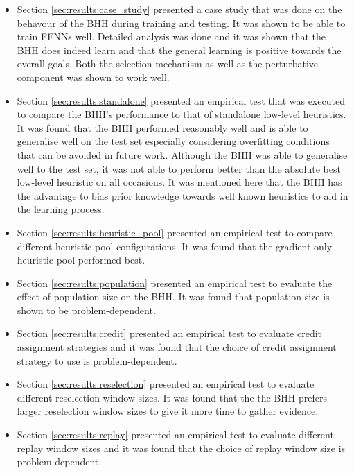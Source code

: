 \begin{itemize}
	\item Section \ref{sec:results:case_study} presented a case study that was done on the behavour of the \Ac{BHH} during training and testing. It was shown to be able to train \acp{FFNN} well. Detailed analysis was done and it was shown that the \Ac{BHH} does indeed learn and that the general learning is positive towards the overall goals. Both the selection mechanism as well as the perturbative component was shown to work well.

	\item Section \ref{sec:results:standalone} presented an empirical test that was executed to compare the \Ac{BHH}'s performance to that of standalone low-level heuristics. It was found that the \Ac{BHH} performed reasonably well and is able to generalise well on the test set especially considering overfitting conditions that can be avoided in future work. Although the \Ac{BHH} was able to generalise well to the test set, it was not able to perform better than the absolute best low-level heuristic on all occasions. It was mentioned here that the \Ac{BHH} has the advantage to bias prior knowledge towards well known heuristics to aid in the learning process.

	\item Section \ref{sec:results:heuristic_pool} presented an empirical test to compare different heuristic pool configurations. It was found that the gradient-only heuristic pool performed best.

	\item Section \ref{sec:results:population} presented an empirical test to evaluate the effect of population size on the \Ac{BHH}. It was found that population size is shown to be problem-dependent.

	\item Section \ref{sec:results:credit} presented an empirical test to evaluate credit assignment strategies and it was found that the choice of credit assignment strategy to use is problem-dependent.

	\item Section \ref{sec:results:reselection} presented an empirical test to evaluate different reselection window sizes. It was found that the the \Ac{BHH} prefers larger reselection window sizes to give it more time to gather evidence.

	\item Section \ref{sec:results:replay} presented an empirical test to evaluate different replay window sizes and it was found that the choice of replay window size is problem dependent.


\end{itemize}
